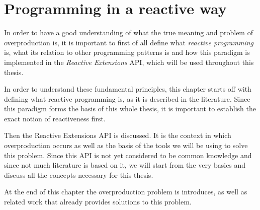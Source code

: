 \chapter{Programming in a reactive way}
\label{chap:problem-statement}

In order to have a good understanding of what the true meaning and problem of overproduction is, it is important to first of all define what \textit{reactive programming} is, what its relation to other programming patterns is and how this paradigm is implemented in the \textit{Reactive Extensions} API, which will be used throughout this thesis.

In order to understand these fundamental principles, this chapter starts off with defining what reactive programming is, as it is described in the literature. Since this paradigm forms the basis of this whole thesis, it is important to establish the exact notion of reactiveness first.

Then the Reactive Extensions API is discussed. It is the context in which overproduction occurs as well as the basis of the tools we will be using to solve this problem. Since this API is not yet considered to be common knowledge and since not much literature is based on it, we will start from the very basics and discuss all the concepts necessary for this thesis.

At the end of this chapter the overproduction problem is introduces, as well as related work that already provides solutions to this problem.






